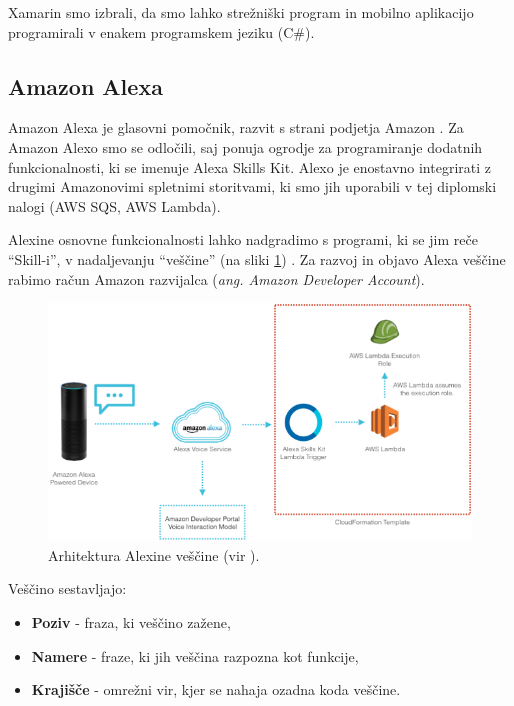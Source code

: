 \documentclass[a4paper, 12pt]{book}
\begin{document}
Xamarin smo izbrali, da smo lahko strežniški program in mobilno aplikacijo programirali v enakem programskem jeziku (C\#).



\subsection{Amazon Alexa}

Amazon Alexa je glasovni pomočnik, razvit s strani podjetja Amazon \cite{alexa}.
Za Amazon Alexo smo se odločili, saj ponuja ogrodje za programiranje dodatnih funkcionalnosti, ki se imenuje Alexa Skills Kit.
Alexo je enostavno integrirati z drugimi Amazonovimi spletnimi storitvami, ki smo jih uporabili v tej diplomski nalogi (AWS SQS, AWS Lambda).

Alexine osnovne funkcionalnosti lahko nadgradimo s programi, ki se jim reče \enquote{Skill-i}, v nadaljevanju \enquote{veščine} (na sliki \ref{alexa_architecture}) \cite{alexaskills}.
Za razvoj in objavo Alexa veščine rabimo račun Amazon razvijalca (\textit{ang. Amazon Developer Account}).

\clearpage

\begin{figure}[H]
\begin{center}
\includegraphics[width=13.5cm]{alexa_architecture}
\end{center}
	\caption{Arhitektura Alexine veščine (vir \cite{alexaarchitecture}).}
\label{alexa_architecture}
\end{figure}

\noindent Veščino sestavljajo:
\begin{itemize}
	\item \textbf{Poziv} - fraza, ki veščino zažene,
	\item \textbf{Namere} - fraze, ki jih veščina razpozna kot funkcije,
	\item \textbf{Krajišče} - omrežni vir, kjer se nahaja ozadna koda veščine.
\end{itemize}
\end{document}
